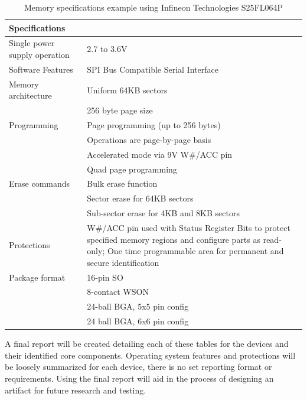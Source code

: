 \begin{table}
  \centering
  \label{table:memory_specs}%
  \caption{Memory specifications example using Infineon Technologies S25FL064P \autocite{S25FL064PSeriesFlash}}
  \begin{tabular}{|p{4cm}|p{12cm}|}
    \hline\rowcolor{gray!30}

    \textbf{Specifications} &  \\
    \hline

    Single power supply operation & 2.7 to 3.6V \\
    \hline

    Software Features & SPI Bus Compatible Serial Interface \\
    \hline

    Memory architecture & Uniform 64KB sectors \\
    & 256 byte page size \\
    \hline

    Programming & Page programming (up to 256 bytes) \\
    & Operations are page-by-page basis \\
    & Accelerated mode via 9V W\#/ACC pin \\
    & Quad page programming \\
    \hline

    Erase commands & Bulk erase function \\
     & Sector erase for 64KB sectors \\
     & Sub-sector erase for 4KB and 8KB sectors \\
    \hline

    Protections & W\#/ACC pin used with Status Register Bits to protect specified memory regions and configure parts as read-only; One time programmable area for permanent and secure identification \\
    \hline

    Package format & 16-pin SO \\
    & 8-contact WSON \\
    & 24-ball BGA, 5x5 pin config \\
    & 24 ball BGA, 6x6 pin config \\
    \hline

  \end{tabular}
\end{table}

A final report will be created detailing each of these tables for the devices and their identified core components. Operating system features and protections will be loosely summarized for each device, there is no set reporting format or requirements. Using the final report will aid in the process of designing an artifact for future research and testing.

